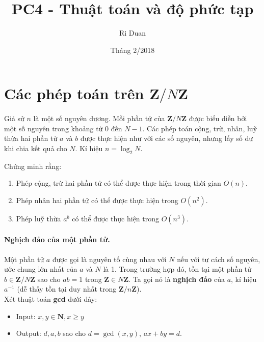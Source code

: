 \documentclass{article}
\title{PC4 - Thuật toán và độ phức tạp}
\author{Ri Duan}
\date{Tháng 2/2018}
\let\mb\mathbf
\begin{document}
\maketitle
\section{Các phép toán trên $\mb Z/ N\mb Z$}

\paragraph{}

Giả sử $n$ là một số nguyên dương. Mỗi phần tử của $\mb Z / N\mb Z$ được biểu diễn bởi một số nguyên trong khoảng từ $0$ đến $N-1$. Các phép toán cộng, trừ, nhân, luỹ thừa hai phần tử $a$ và $b$ được thực hiện như với các số nguyên, nhưng lấy số dư khi chia kết quả cho $N$. Kí hiệu $n = \log_2 N$. 

\begin{em}
Chứng minh rằng:

\begin{enumerate}
    \item Phép cộng, trừ hai phần tử có thể được thực hiện trong thời gian $O(n)$. 
    \item Phép nhân hai phần tử có thể được thực hiện trong $O(n^2)$.
    \item Phép luỹ thừa $a^b$ có thể được thực hiện trong $O(n^3)$.
\end{enumerate}
\end{em}

\paragraph{Nghịch đảo của một phần tử. } Một phần tử $a$ được gọi là nguyên tố cùng nhau với $N$ nếu với tư cách số nguyên, ước chung lớn nhất của $a$ và $N$ là 1. Trong trường hợp đó, tồn tại một phần tử $b \in \mb Z/ N \mb Z$ sao cho $ab = 1$ trong $\mb Z \in N \mb Z$. Ta gọi nó là \textbf{nghịch đảo} của $a$, kí hiệu $a^{-1}$ (dễ thấy tồn tại duy nhất trong $\mb Z / n\mb Z$).\\

Xét thuật toán \textbf{gcd} dưới đây:

\begin{itemize}
    \item Input: $x, y \in \mathbf N, x\geq y$
    \item Output: $d, a, b$ sao cho $d = \gcd(x, y)$, $ax + by =d$.
\end{itemize}
\end{document}
